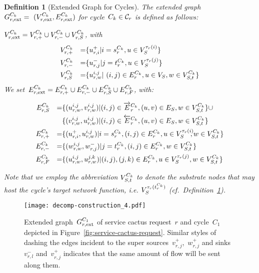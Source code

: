 \documentclass[10pt, conference, letterpaper]{IEEEtran}
\newtheorem{definition}[theorem]{Definition}
\begin{document}
\begin{definition}[Extended Graph for Cycles]
\label{def:service-cactus-extended-graph-cycle}
The extended graph~$\VGextcycle =~(\VVextcycle, \VEextcycle)$ for cycle~$C_k \in \Cycles$ is defined as follows:

$\VVextcycle = \VVextcycleSources \cup \VVextcycleTargets \cup \VVextcycleSubstrate$, with
\begin{alignat*}{3}
\VVextcycleSources && = &  \{ u^+_{r,i} | i = \VVcycleSource, u \in \SVTypes[\Vtype(i)]\}\\
\VVextcycleTargets && = &  \{ u^-_{r,j} | j = \VVcycleTarget, u \in \SVTypes[\Vtype(j)]\} \\
\VVextcycleSubstrate && = &  \{ u^{i,j}_{r,w} |~(i,j) \in  \VEcycle, u \in \SV, w \in \SVTypesCycle \}
\end{alignat*}
We set~$\VEextcycle = \VEextcycleSources \cup \VEextcycleTargets \cup \VEextcycleSubstrate \cup \VEextcycleF$, with:
{
\begin{alignat*}{3}
\VEextcycleSubstrate && = & \{(u^{i,j}_{\req,w}, v^{i,j}_{\req,w})|(i,j)\in \VEcycleSame,(u,v)\in \SE, w \in \SVTypesCycle \} \cup \\
 && & \{(v^{i,j}_{\req,w}, u^{i,j}_{\req,w})|(i,j) \in \VEcycleDiff,(u,v)\in \SE, w \in \SVTypesCycle \} \\
\VEextcycleSources && = & \{(u^+_{\req,i}, u^{i,j}_{\req,w})| i = \VVcycleSource,(i,j)\in \VEcycle, u \in \SVTypes[\Vtype(i)]\hspace{-5pt},  w \in \SVTypesCycle \} \\
\VEextcycleTargets &&= &\{(w^{i,j}_{\req,w}, w^-_{\req,j})| j = \VVcycleTarget,(i,j) \in \VEcycle, w \in \SVTypesCycle \}  \\
\VEextcycleF && = &\{(u^{i,j}_{\req,w}, u^{j,k}_{\req,w})|(i,j),(j,k)\in \VEcycle, u \in \SVTypes[\Vtype(j)], w \in \SVTypesCycle \}
\end{alignat*}

Note that we employ the abbreviation $V^{C_k}_{S,t}$ to denote the substrate nodes that may host the cycle's target network function, i.e. $\SVTypes[\Vtype(\VVcycleTarget)]$ (cf.~Definition~\ref{def:service-cactus-extended-graph-cycle}).

}
\end{definition}


\begin{figure}[t!]
\centering
\texttt{[image: decomp-construction\_4.pdf]}
\caption{Extended graph~$\VGextcycle[\req][1]$ of service cactus request~$r$ and cycle~$C_1$ depicted in  Figure~\ref{fig:service-cactus-request}. Similar styles of dashing the edges incident to the super sources~$v^+_{r,j}$,~$w^+_{r,j}$ and sinks~$v^-_{r,l}$ and~$v^+_{r,j}$ indicates that the same amount of flow will be sent along them.}
\label{fig:service-cactus-construction-cycle}
\end{figure}
\end{document}
